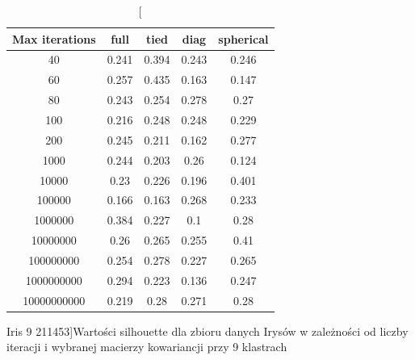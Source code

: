 \documentclass{classrep}
\begin{document}
{{\begin{table}[!htbp]
                \centering
                \begin{tabular}{|c|c|c|c|c|}
                \hline
                Max iterations & full & tied & diag & spherical \\ \hline
                40 & 0.241 & 0.394 & 0.243 & 0.246 \\ \hline
                60 & 0.257 & 0.435 & 0.163 & 0.147 \\ \hline
                80 & 0.243 & 0.254 & 0.278 & 0.27 \\ \hline
                100 & 0.216 & 0.248 & 0.248 & 0.229 \\ \hline
                200 & 0.245 & 0.211 & 0.162 & 0.277 \\ \hline
                1000 & 0.244 & 0.203 & 0.26 & 0.124 \\ \hline
                10000 & 0.23 & 0.226 & 0.196 & 0.401 \\ \hline
                100000 & 0.166 & 0.163 & 0.268 & 0.233 \\ \hline
                1000000 & 0.384 & 0.227 & 0.1 & 0.28 \\ \hline
                10000000 & 0.26 & 0.265 & 0.255 & 0.41 \\ \hline
                100000000 & 0.254 & 0.278 & 0.227 & 0.265 \\ \hline
                1000000000 & 0.294 & 0.223 & 0.136 & 0.247 \\ \hline
                10000000000 & 0.219 & 0.28 & 0.271 & 0.28 \\ \hline
                \end{tabular}
                \caption
                [Iris 9 211453]{Wartości silhouette dla zbioru danych Irysów w zależności od liczby iteracji i wybranej macierzy kowariancji przy 9 klastrach}
                \label{Iris_9_211453}
                \hfill
            
            \end{table}
            
}}
\end{document}
